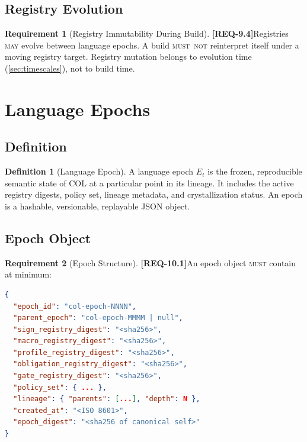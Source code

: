 \documentclass[11pt,a4paper,twoside]{article}
\theoremstyle{definition}
\newtheorem{requirement}{Requirement}[section]
\newtheorem{definition}{Definition}[section]
\theoremstyle{remark}
\newcommand{\req}[1]{\textbf{\textcolor{reqred}{[REQ-#1]}}}
\newcommand{\must}{\textsc{must}}
\newcommand{\mustnot}{\textsc{must~not}}
\newcommand{\may}{\textsc{may}}
\begin{document}
\subsection{Registry Evolution}

\begin{requirement}[Registry Immutability During Build]
\label{req:reg-immutable}
\req{9.4}\quad Registries \may{} evolve between language epochs. A build \mustnot{} reinterpret itself under a moving registry target. Registry mutation belongs to evolution time (\cref{sec:timescales}), not to build time.
\end{requirement}



\section{Language Epochs}
\label{sec:epochs}

\subsection{Definition}

\begin{definition}[Language Epoch]
A language epoch $E_t$ is the frozen, reproducible semantic state of COL at a particular point in its lineage. It includes the active registry digests, policy set, lineage metadata, and crystallization status. An epoch is a hashable, versionable, replayable JSON object.
\end{definition}

\subsection{Epoch Object}

\begin{requirement}[Epoch Structure]
\label{req:epoch-struct}
\req{10.1}\quad An epoch object \must{} contain at minimum:
\end{requirement}

\begin{lstlisting}[language=JSON,caption={Epoch Object Schema}]
{
  "epoch_id": "col-epoch-NNNN",
  "parent_epoch": "col-epoch-MMMM | null",
  "sign_registry_digest": "<sha256>",
  "macro_registry_digest": "<sha256>",
  "profile_registry_digest": "<sha256>",
  "obligation_registry_digest": "<sha256>",
  "gate_registry_digest": "<sha256>",
  "policy_set": { ... },
  "lineage": { "parents": [...], "depth": N },
  "created_at": "<ISO 8601>",
  "epoch_digest": "<sha256 of canonical self>"
}
\end{lstlisting}
\end{document}
